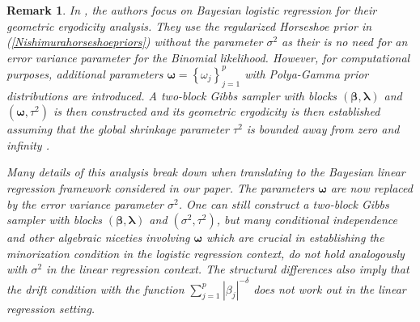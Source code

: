 \documentclass[noinfoline,11pt]{imsart}
\numberwithin{equation}{section}
\theoremstyle{plain}
\newtheorem{remark}{Remark}[section]
\newcommand{\bb}{\boldsymbol{\beta}}
\newcommand{\bl}{\boldsymbol{\lambda}}
\begin{document}
\begin{remark} \label{remregular}
In \cite{nishimura2019shrinkage}, the authors focus on Bayesian logistic regression for their geometric ergodicity analysis. They use the regularized Horseshoe prior in (\ref{Nishimurahorseshoepriors}) without the parameter $\sigma^2$ as their is no need for an error variance parameter for the Binomial likelihood. However, for computational purposes, additional parameters ${\boldsymbol \omega} = \left\{\omega_j\right\}_{j=1}^p$ with Polya-Gamma prior distributions are introduced. A two-block Gibbs sampler with blocks $(\bb, \bl)$ and $({\boldsymbol \omega}, \tau^2)$ is then constructed and its geometric ergodicity is then established assuming that the global shrinkage parameter $\tau^2$ is bounded away from zero and infinity 
\cite[Theorem 4.6]{nishimura2019shrinkage}. 

Many details of this analysis break down when translating to the Bayesian linear 
regression framework considered in our paper. The parameters 
${\boldsymbol \omega}$ are now replaced by the error variance parameter $\sigma^2$. 
One can still construct a two-block Gibbs sampler with blocks $(\bb, \bl)$ and 
$(\sigma^2, \tau^2)$, but many conditional independence and other algebraic niceties 
involving ${\boldsymbol \omega}$ which are crucial in establishing the 
minorization condition in the logistic regression context, do not hold analogously 
with $\sigma^2$ in the linear regression context. The structural differences also 
imply that the drift condition with the function $\sum\limits_{j=1}^p |\beta_j|^{-\delta}$ 
does not work out in the linear regression setting. 

\iffalse

One can possibly emulate the 
analysis in \cite{BBJJ:2020}, use the blocks $(\bb, \sigma^2, \tau^2)$ and $\bl$, and 
try to use a drift function of the form $\sum\limits_{j=1}^p (\sigma \tau)^\delta 
|\beta_j|^{-\delta}$. Even if the drift analysis were to succeed with this choice, to 
the best of our understanding the global parameter $\tau^2$ will need to be assumed to be bounded above {\it and} below in order to establish an associated minorization condition. In contrast, our approach focuses on the $\bl$-chain and uses a drift function which is unbounded off compact sets to establish geometric ergodicity under the strictly weaker assumption that the global shrinkage parameter is truncated below, and has a finite prior $\delta/2^{th}$ moment for some $\delta > 0.0016$. 

\fi

\end{remark}
\end{document}
